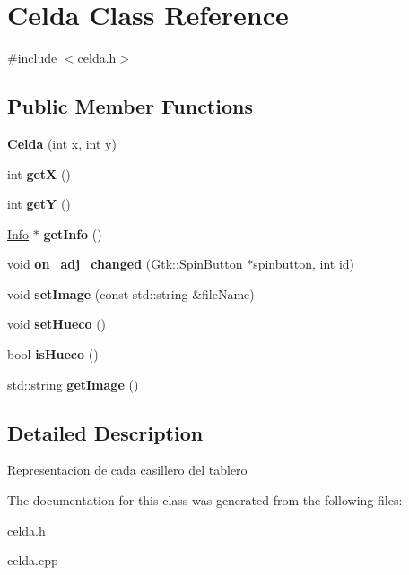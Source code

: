 \hypertarget{classCelda}{\section{Celda Class Reference}
\label{classCelda}
}


{\ttfamily \#include $<$celda.\-h$>$}

\subsection*{Public Member Functions}
\begin{DoxyCompactItemize}
\item 
\hypertarget{classCelda_a8062a01c45ec1a899c9c76238fe05e65}{{\bfseries Celda} (int x, int y)}\label{classCelda_a8062a01c45ec1a899c9c76238fe05e65}

\item 
\hypertarget{classCelda_a7a7d0b12316a5190a6c93efa1732c22c}{int {\bfseries get\-X} ()}\label{classCelda_a7a7d0b12316a5190a6c93efa1732c22c}

\item 
\hypertarget{classCelda_ae80269557d150404a44c87e8776d7c28}{int {\bfseries get\-Y} ()}\label{classCelda_ae80269557d150404a44c87e8776d7c28}

\item 
\hypertarget{classCelda_a6644d06c3166b158b099dd201cf31e9d}{\hyperlink{classInfo}{Info} $\ast$ {\bfseries get\-Info} ()}\label{classCelda_a6644d06c3166b158b099dd201cf31e9d}

\item 
\hypertarget{classCelda_aa51b9270362a5dbfddd26d63ce73640e}{void {\bfseries on\-\_\-adj\-\_\-changed} (Gtk\-::\-Spin\-Button $\ast$spinbutton, int id)}\label{classCelda_aa51b9270362a5dbfddd26d63ce73640e}

\item 
\hypertarget{classCelda_ada58827a0b78cedd93d252f5fb46270d}{void {\bfseries set\-Image} (const std\-::string \&file\-Name)}\label{classCelda_ada58827a0b78cedd93d252f5fb46270d}

\item 
\hypertarget{classCelda_a6215b4789f375d0dd51c2520ec4d0bf9}{void {\bfseries set\-Hueco} ()}\label{classCelda_a6215b4789f375d0dd51c2520ec4d0bf9}

\item 
\hypertarget{classCelda_aefde1dc1b85f037b4b3407047518a668}{bool {\bfseries is\-Hueco} ()}\label{classCelda_aefde1dc1b85f037b4b3407047518a668}

\item 
\hypertarget{classCelda_a8f8707d6810645d1790e97b73d7fae43}{std\-::string {\bfseries get\-Image} ()}\label{classCelda_a8f8707d6810645d1790e97b73d7fae43}

\end{DoxyCompactItemize}


\subsection{Detailed Description}
Representacion de cada casillero del tablero 

The documentation for this class was generated from the following files\-:\begin{DoxyCompactItemize}
\item 
celda.\-h\item 
celda.\-cpp\end{DoxyCompactItemize}
